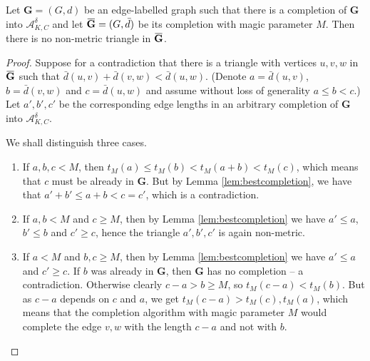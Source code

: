 \documentclass[11pt]{amsart}
\newcommand{\overbar}[1]{\mkern 1.5mu\overline{\mkern-1.5mu#1\mkern-1.5mu}\mkern 1.5mu}
\def\str#1{\mathbf {#1}}
\begin{document}
\begin{lemma}
Let $\str{G}=(G,d)$ be an edge-labelled graph such that there is a completion of $\str{G}$ into $\mathcal A^\delta_{K,C}$ and let $\overbar{\str{G}}=(G,\bar{d})$ be its completion with magic parameter $M$. Then there is no non-metric triangle in $\overbar{\str{G}}$.
\end{lemma}
\begin{proof}
Suppose for a contradiction that there is a triangle with vertices $u,v,w$ in $\overbar{\str{G}}$ such that $\bar{d}(u,v)+\bar{d}(v,w)<\bar{d}(u,w)$. (Denote $a=\bar{d}(u,v)$, $b=\bar{d}(v,w)$ and $c=\bar{d}(u,w)$ and assume without loss of generality $a\leq b < c$.) Let $a',b',c'$ be the corresponding edge lengths in an arbitrary completion of $\str{G}$ into $\mathcal A^\delta_{K,C}$.

We shall distinguish three cases.
\begin{enumerate}
\item If $a,b,c < M$, then $t_M(a)\leq t_M(b) < t_M(a+b) < t_M(c)$, which means that $c$ must be already in $\str{G}$. But by Lemma \ref{lem:bestcompletion}, we have that $a' + b' \leq a  + b < c = c'$, which is a contradiction.

\item If $a,b<M$ and $c\geq M$, then by Lemma \ref{lem:bestcompletion} we have $a'\leq a$, $b'\leq b$ and $c'\geq c$, hence the triangle $a',b',c'$ is again non-metric.

\item If $a<M$ and $b,c\geq M$, then by Lemma \ref{lem:bestcompletion} we have $a'\leq a$ and $c'\geq c$. If $b$ was already in $\str{G}$, then $\str{G}$ has no completion -- a contradiction. Otherwise clearly $c-a > b \geq M$, so $t_M(c-a) < t_M(b)$. But as $c-a$ depends on $c$ and $a$, we get $t_M(c-a) > t_M(c),t_M(a)$, which means that the completion algorithm with magic parameter $M$ would complete the edge $v,w$ with the length $c-a$ and not with $b$.
\end{enumerate}
\end{proof}
\end{document}
